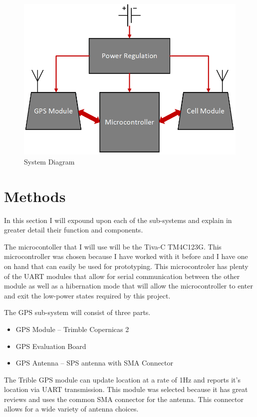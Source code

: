 \documentclass[11pt]{article}
\begin{document}
\begin{figure}[H]
   \centering
       \includegraphics[scale=0.4]{PTD.png}
   \caption{System Diagram}
   \label{fig:sys_diagram}
\end{figure}


\section{Methods}
In this section I will expound upon each of the sub-systems and explain in greater detail their function and components.

The microcontoller that I will use will be the Tiva-C TM4C123G. This microcontroller was chosen because I have worked with it before and I have one 
on hand that can easily be used for prototyping. This microcontroler has plenty of the UART modules that allow for serial communication between the other 
module as well as a hibernation mode that will allow the microcontroller to enter and exit the low-power states required by this project.

The GPS sub-system will consist of three parts.
\begin{itemize}
    \item GPS Module -- Trimble Copernicas 2
    \item GPS Evaluation Board
    \item GPS Antenna -- SPS antenna with SMA Connector
\end{itemize}
The Trible GPS module can update location at a rate of 1Hz and reports it's location via UART transmission. This module was selected because it has great 
reviews and uses the common SMA connector for the antenna. This connector allows for a wide variety of antenna choices.
\end{document}
